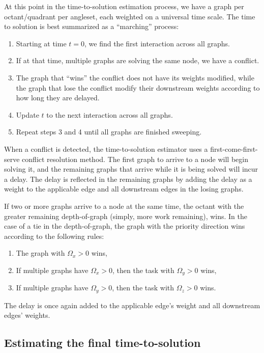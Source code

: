 At this point in the time-to-solution estimation process, we have a graph per octant/quadrant per angleset, each weighted on a universal time scale. The time to solution is best summarized as a ``marching'' process:
\begin{enumerate}
  \item Starting at time $t=0$, we find the first interaction across all graphs. 
  \item If at that time, multiple graphs are solving the same node, we have a conflict. 
  \item The graph that ``wins'' the conflict does not have its weights modified, while the graph that lose the conflict modify their downstream weights according to how long they are delayed. 
  \item Update $t$ to the next interaction across all graphs. 
  \item Repeat steps 3 and 4 until all graphs are finished sweeping.
\end{enumerate}

When a conflict is detected, the time-to-solution estimator uses a first-come-first-serve conflict resolution method. The first graph to arrive to a node will begin solving it, and the remaining graphs that arrive while it is being solved will incur a delay. The delay is reflected in the remaining graphs by adding the delay as a weight to the applicable edge and all downstream edges in the losing graphs. 

If two or more graphs arrive to a node at the same time, the octant with the greater remaining depth-of-graph (simply, more work remaining), wins. In the case of a tie in the depth-of-graph, the graph with the priority direction wins according to the following rules:
\begin{enumerate}
    \item The graph with $\Omega_x > 0$ wins,
	\item If multiple graphs have $\Omega_x > 0$, then the task with $\Omega_y > 0$ wins,
	\item If multiple graphs have $\Omega_y > 0$, then the task with $\Omega_z > 0$ wins.
\end{enumerate}
The delay is once again added to the applicable edge's weight and all downstream edges' weights.

\subsection{Estimating the final time-to-solution}


